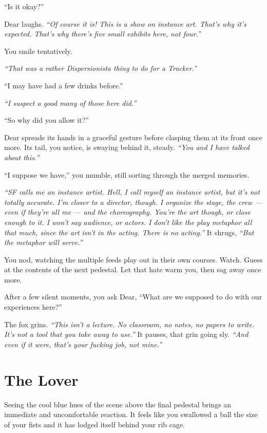 ``Is it okay?''

Dear laughs. \emph{``Of course it is! This is a show on instance art. That's why it's expected. That's why there's five small exhibits here, not four.''}

You smile tentatively.

\emph{``That was a rather Dispersionista thing to do for a Tracker.''}

``I may have had a few drinks before.''

\emph{``I suspect a good many of those here did.''}

``So why did you allow it?''

Dear spreads its hands in a graceful gesture before clasping them at its front once more. Its tail, you notice, is swaying behind it, steady. \emph{``You and I have talked about this.''}

``I suppose we have,'' you mumble, still sorting through the merged memories.

\emph{``SF calls me an instance artist. Hell, I call myself an instance artist, but it's not totally accurate. I'm closer to a director, though. I organize the stage, the crew --- even if they're all me --- and the choreography. You're the art though, or close enough to it. I won't say audience, or actors. I don't like the play metaphor all that much, since the art isn't in the acting. There is no acting.''}  It shrugs, \emph{``But the metaphor will serve.''}

You nod, watching the multiple feeds play out in their own courses. Watch. Guess at the contents of the next pedestal. Let that hate warm you, then sag away once more.

After a few silent moments, you ask Dear, ``What are we supposed to do with our experiences here?''

The fox grins. \emph{``This isn't a lecture. No classroom, no notes, no papers to write. It's not a tool that you take away to use.''} It pauses, that grin going sly. \emph{``And even if it were, that's your fucking job, not mine.''}

\newpage

\section*{The Lover}

Seeing the cool blue hues of the scene above the final pedestal brings an immediate and uncomfortable reaction. It feels like you swallowed a ball the size of your fists and it has lodged itself behind your rib cage.

